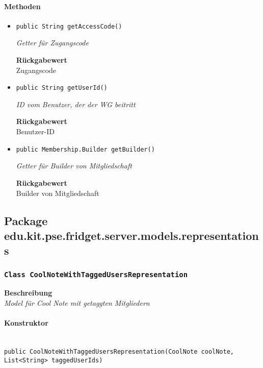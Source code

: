     \paragraph*{Methoden}
    \begin{itemize}
    	\item{\texttt{public String getAccessCode()}}
    	
    	\textit{Getter für Zugangscode}
    	
    	
    	
    	\textbf{Rückgabewert} \\
    	Zugangscode        \item{\texttt{public String getUserId()}}
    	
    	\textit{ID vom Benutzer, der der WG beitritt}
    	
    	
    	
    	\textbf{Rückgabewert} \\
    	Benutzer-ID        \item{\texttt{public Membership.Builder getBuilder()}}
    	
    	\textit{Getter für Builder von Mitgliedschaft}
    	
    	
    	
    	\textbf{Rückgabewert} \\
    	Builder von Mitgliedschaft
    \end{itemize}
    \subsection{Package edu.kit.pse.fridget.server.models.representations}
    \subsubsection{\texttt{Class CoolNoteWithTaggedUsersRepresentation}}
    \textbf{Beschreibung} \\
    \textit{Model für Cool Note mit getaggten Mitgliedern}
    \paragraph*{Konstruktor}\mbox{} \\
    \texttt{public CoolNoteWithTaggedUsersRepresentation(CoolNote coolNote, List<String> taggedUserIds)} \\
